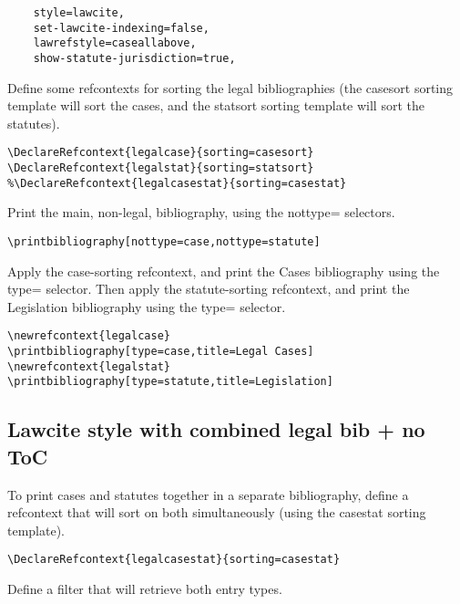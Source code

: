 \documentclass[12pt]{article}
\newcommand\goodoh{{\large\ftmark 🗸}}
\begin{document}
\begin{verbatim}
	style=lawcite, 
	set-lawcite-indexing=false,
	lawrefstyle=caseallabove,
	show-statute-jurisdiction=true,
\end{verbatim}

Define some refcontexts for sorting the legal bibliographies (the casesort sorting template will sort the cases, and the statsort sorting template will sort the statutes).

\begin{verbatim}
\DeclareRefcontext{legalcase}{sorting=casesort}
\DeclareRefcontext{legalstat}{sorting=statsort}
%\DeclareRefcontext{legalcasestat}{sorting=casestat}
\end{verbatim}

Print the main, non-legal, bibliography, using the nottype= selectors.

\begin{verbatim}
\printbibliography[nottype=case,nottype=statute]
\end{verbatim}

Apply the case-sorting refcontext, and print the Cases bibliography using the type= selector.
Then apply the statute-sorting refcontext, and print the Legislation bibliography using the type= selector.

\begin{verbatim}
\newrefcontext{legalcase}
\printbibliography[type=case,title=Legal Cases]
\newrefcontext{legalstat}
\printbibliography[type=statute,title=Legislation]
\end{verbatim}





\subsection{Lawcite style with combined legal bib + no ToC}

To print cases and statutes together in a separate bibliography, define a refcontext that will sort on both simultaneously (using the casestat sorting template).

\begin{verbatim}
\DeclareRefcontext{legalcasestat}{sorting=casestat}
\end{verbatim}

Define a filter that will retrieve both entry types.
\end{document}
